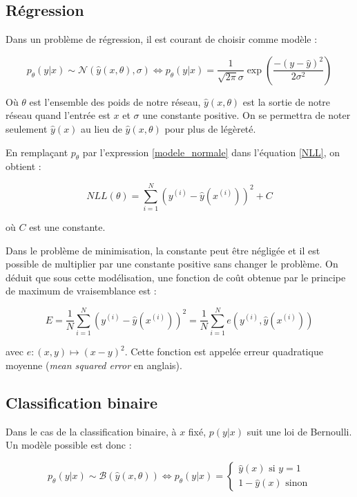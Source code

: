 \subsection{Régression}

Dans un problème de régression, il est courant de choisir comme modèle :

\begin{equation}
p_{\theta}(y|x) \sim \mathcal{N}(\hat{y}(x, \theta), \sigma) \Leftrightarrow p_{\theta}(y|x) = \frac{1}{\sqrt{2\pi}\sigma}\exp{(\frac{-(y - \hat{y})^2}{2\sigma^2})}
\label{modele_normale}
\end{equation}

Où $\theta$ est l'ensemble des poids de notre réseau, $\hat{y}(x, \theta)$ est la sortie de notre réseau quand l'entrée est $x$ et $\sigma$ une constante positive. On se permettra de noter seulement $\hat{y}(x)$ au lieu de $\hat{y}(x, \theta)$ pour plus de légèreté.


En remplaçant $p_{\theta}$ par l'expression \ref{modele_normale} dans l'équation \ref{NLL}, on obtient :

\begin{equation}
NLL(\theta) = \sum_{i=1}^{N}{(y^{(i)} - \hat{y}(x^{(i)}))^2} + C
\end{equation}

où $C$ est une constante.

Dans le problème de minimisation, la constante peut être négligée et il est possible de multiplier par une constante positive sans changer le problème. On déduit que sous cette modélisation, une fonction de coût obtenue par le principe de maximum de vraisemblance est :

\begin{equation}
E = \frac{1}{N}\sum_{i=1}^{N}{(y^{(i)} - \hat{y}(x^{(i)}))^2} = \frac{1}{N}\sum_{i=1}^{N}{e(y^{(i)}, \hat{y}(x^{(i)}))}
\end{equation}

avec $e : (x, y) \mapsto (x - y)^2$. Cette fonction est appelée erreur quadratique moyenne (\textit{mean squared error} en anglais).

\subsection{Classification binaire}

Dans le cas de la classification binaire, à $x$ fixé, $p(y|x)$ suit une loi de Bernoulli. Un modèle possible est donc :

\begin{equation}
p_{\theta}(y|x) \sim \mathcal{B}(\hat{y}(x, \theta)) \Leftrightarrow p_{\theta}(y|x) = 
\left\{
    \begin{array}{ll}
        \hat{y}(x) \text{ si } y = 1 \\
        1 - \hat{y}(x) \text{ sinon}
    \end{array}
\right.
\label{modele_bernoulli}
\end{equation}

